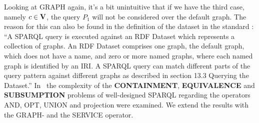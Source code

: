 				Looking at GRAPH again, it's a bit unintuitive that if we have
				the third case, namely $c \in \mathbf{V}$, the query $P_1$ will not be considered over the
				default graph. The reason for this can also be found in the definition of the
				dataset in the standard \cite{w3standard}:
				``A SPARQL query is executed against an RDF Dataset which represents a collection
				of graphs. An RDF Dataset comprises one graph, the default graph, which does not
				have a name, and zero or more named graphs, where each named graph is identified
				by an IRI. A SPARQL query can match different parts of the query pattern against
				different graphs as described in section 13.3 Querying the Dataset.''
				In~\cite{pichler2014containment} the complexity of the \textbf{CONTAINMENT},
				\textbf{EQUIVALENCE} and \textbf{SUBSUMPTION}
				problems of well-designed SPARQL regarding the operators AND, OPT, UNION and 
				projection were examined.  We extend the results with the GRAPH- and the SERVICE
				operator. 
